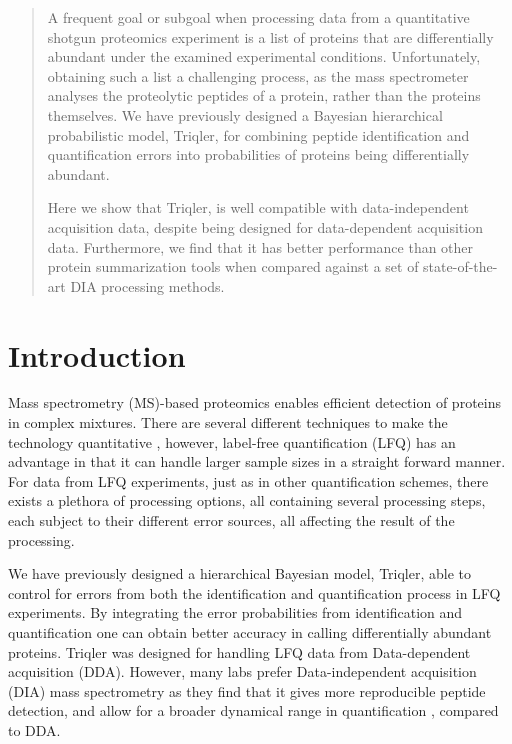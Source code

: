 \documentclass[10pt,letterpaper]{article}
\begin{document}
\maketitle



\begin{abstract}

A frequent goal or subgoal when processing data from a quantitative shotgun proteomics experiment is a list of proteins that are differentially abundant under the examined experimental conditions. Unfortunately, obtaining such a list a challenging process, as the mass spectrometer analyses the proteolytic peptides of a protein, rather than the proteins themselves. We have previously designed a Bayesian hierarchical probabilistic model, Triqler, for combining peptide identification and quantification errors into probabilities of proteins being differentially abundant. 

Here we show that Triqler, is well compatible with data-independent acquisition data, despite being designed for data-dependent acquisition data. Furthermore, we find that it has better performance than other protein summarization tools when compared against a set of state-of-the-art DIA processing methods. 
\end{abstract}
  

\section*{Introduction}

Mass spectrometry (MS)-based proteomics enables efficient detection of proteins in complex mixtures. There are several different techniques to make the technology quantitative \cite{bantscheff2007quantitative,kall2011computational}, however, label-free quantification (LFQ) \cite{bondarenko2002identification} has an advantage in that it can handle larger sample sizes in a straight forward manner. For data from LFQ experiments, just as in other quantification schemes, there exists a plethora of processing options, all containing several processing steps, each subject to their different error sources, all affecting the result of the processing.


We have previously designed a hierarchical Bayesian model, Triqler, able to control for errors from both the identification and quantification process in LFQ experiments\cite{The2018Integrated}. By integrating the error probabilities from identification and quantification one can obtain better accuracy in calling differentially abundant proteins. Triqler was designed for handling LFQ data from Data-dependent acquisition (DDA). However, many labs prefer Data-independent acquisition (DIA) mass spectrometry \cite{venable2004automated} as they find that it gives more reproducible peptide detection, and allow for a broader dynamical range in quantification \cite{bern2010deconvolution,zhang2020DIA}, compared to DDA. 
\end{document}
